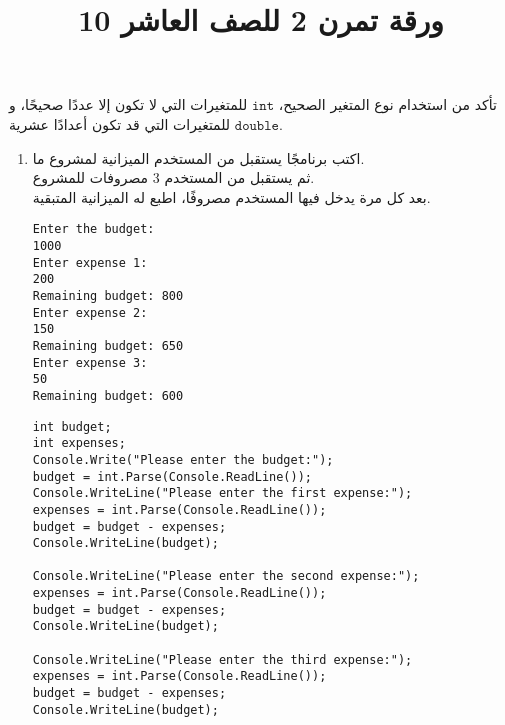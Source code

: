 ﻿\documentclass[12pt]{article}
\title{ورقة تمرن 2 للصف العاشر 10}
\begin{document}
\maketitle
\thispagestyle{fancy}

\begin{boxNote}
    تأكد من استخدام نوع المتغير الصحيح، $\mathtt{int}$ للمتغيرات التي لا تكون إلا عددًا صحيحًا، و $\mathtt{double}$ للمتغيرات التي قد تكون أعدادًا عشرية.
\end{boxNote}

\begin{enumerate}

\item
اكتب برنامجًا يستقبل من المستخدم الميزانية لمشروع ما. \\
ثم يستقبل من المستخدم 3 مصروفات للمشروع. \\
بعد كل مرة يدخل فيها المستخدم مصروفًا، اطبع له الميزانية المتبقية. \\
\ifdetailed
\begin{boxExample}
\begin{english}
\begin{verbatim}
Enter the budget:
1000
Enter expense 1:
200
Remaining budget: 800
Enter expense 2:
150
Remaining budget: 650
Enter expense 3:
50
Remaining budget: 600
\end{verbatim}
\end{english}
\end{boxExample}

\ifwithsols
\begin{boxSolution}
\begin{english}
\begin{verbatim}
int budget;
int expenses;
Console.Write("Please enter the budget:");
budget = int.Parse(Console.ReadLine());
Console.WriteLine("Please enter the first expense:");
expenses = int.Parse(Console.ReadLine());
budget = budget - expenses;
Console.WriteLine(budget);

Console.WriteLine("Please enter the second expense:");
expenses = int.Parse(Console.ReadLine());
budget = budget - expenses;
Console.WriteLine(budget);

Console.WriteLine("Please enter the third expense:");
expenses = int.Parse(Console.ReadLine());
budget = budget - expenses;
Console.WriteLine(budget);
\end{verbatim}
\end{english}
\end{boxSolution}
\fi

\clearpage
\fi


\end{enumerate}
\end{document}
